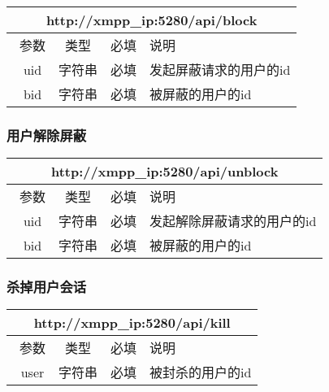 \documentclass[cs4size]{ctexartutf8}
\begin{document}
\begin{table}[H]
   \begin{center}
\begin{tabular}{|c|c|c|p{12cm}|}
\hline
\multicolumn{4}{|c|}{http://xmpp\_ip:5280/api/block} \\
\hline\hline
 \  参数  & 类型 & 必填 &  说明  \\
\hline
 \  uid  & 字符串 & 必填 &  发起屏蔽请求的用户的id  \\
\hline
 \  bid  & 字符串 & 必填 &  被屏蔽的用户的id  \\
\hline
\end{tabular}
   \end{center}
\end{table}

\subsubsection{用户解除屏蔽}

\begin{table}[H]
   \begin{center}
\begin{tabular}{|c|c|c|p{12cm}|}
\hline
\multicolumn{4}{|c|}{http://xmpp\_ip:5280/api/unblock} \\
\hline\hline
 \  参数  & 类型 & 必填 &  说明  \\
\hline
 \  uid  & 字符串 & 必填 &  发起解除屏蔽请求的用户的id  \\
\hline
 \  bid  & 字符串 & 必填 &  被屏蔽的用户的id  \\
\hline
\end{tabular}
   \end{center}
\end{table}


\subsubsection{杀掉用户会话}

\begin{table}[H]
   \begin{center}
\begin{tabular}{|c|c|c|p{12cm}|}
\hline
\multicolumn{4}{|c|}{http://xmpp\_ip:5280/api/kill} \\
\hline\hline
 \  参数  & 类型 & 必填 &  说明  \\
\hline
 \  user  & 字符串 & 必填 &  被封杀的用户的id  \\
\hline
\end{tabular}
   \end{center}
\end{table}
\end{document}
